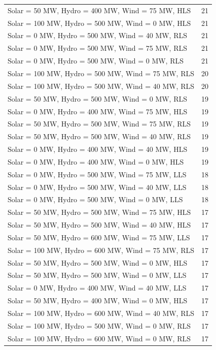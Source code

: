 \documentclass[10pt]{report}
\begin{document}
\begin{table}[H]
{\begin{tabular}{lr}
Solar = 50 MW, Hydro = 400 MW, Wind = 75 MW, HLS & 21 \\
Solar = 100 MW, Hydro = 500 MW, Wind = 0 MW, HLS & 21 \\
Solar = 0 MW, Hydro = 500 MW, Wind = 40 MW, RLS & 21 \\
Solar = 0 MW, Hydro = 500 MW, Wind = 75 MW, RLS & 21 \\
Solar = 0 MW, Hydro = 500 MW, Wind = 0 MW, RLS & 21 \\
Solar = 100 MW, Hydro = 500 MW, Wind = 75 MW, RLS & 20 \\
Solar = 100 MW, Hydro = 500 MW, Wind = 40 MW, RLS & 20 \\
Solar = 50 MW, Hydro = 500 MW, Wind = 0 MW, RLS & 19 \\
Solar = 0 MW, Hydro = 400 MW, Wind = 75 MW, HLS & 19 \\
Solar = 50 MW, Hydro = 500 MW, Wind = 75 MW, RLS & 19 \\
Solar = 50 MW, Hydro = 500 MW, Wind = 40 MW, RLS & 19 \\
Solar = 0 MW, Hydro = 400 MW, Wind = 40 MW, HLS & 19 \\
Solar = 0 MW, Hydro = 400 MW, Wind = 0 MW, HLS & 19 \\
Solar = 0 MW, Hydro = 500 MW, Wind = 75 MW, LLS & 18 \\
Solar = 0 MW, Hydro = 500 MW, Wind = 40 MW, LLS & 18 \\
Solar = 0 MW, Hydro = 500 MW, Wind = 0 MW, LLS & 18 \\
Solar = 50 MW, Hydro = 500 MW, Wind = 75 MW, HLS & 17 \\
Solar = 50 MW, Hydro = 500 MW, Wind = 40 MW, HLS & 17 \\
Solar = 50 MW, Hydro = 600 MW, Wind = 75 MW, LLS & 17 \\
Solar = 100 MW, Hydro = 600 MW, Wind = 75 MW, RLS & 17 \\
Solar = 50 MW, Hydro = 500 MW, Wind = 0 MW, HLS & 17 \\
Solar = 50 MW, Hydro = 500 MW, Wind = 0 MW, LLS & 17 \\
Solar = 0 MW, Hydro = 400 MW, Wind = 40 MW, LLS & 17 \\
Solar = 50 MW, Hydro = 400 MW, Wind = 0 MW, HLS & 17 \\
Solar = 100 MW, Hydro = 600 MW, Wind = 40 MW, RLS & 17 \\
Solar = 100 MW, Hydro = 500 MW, Wind = 0 MW, RLS & 17 \\
Solar = 100 MW, Hydro = 600 MW, Wind = 0 MW, RLS & 17 \\

\end{tabular}}
\end{table}
\end{document}
